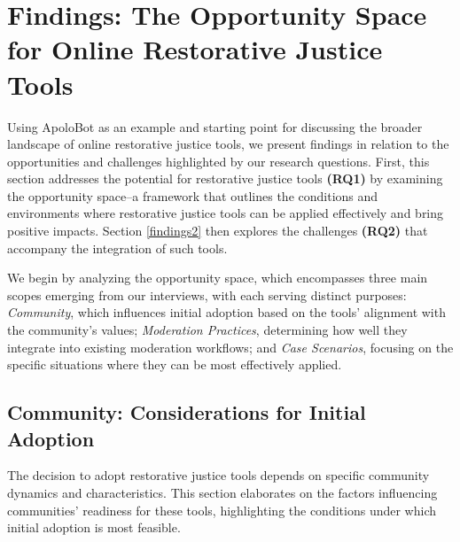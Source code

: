 \section{Findings: The Opportunity Space for Online Restorative Justice Tools} \label{findings1}
Using ApoloBot as an example and starting point for discussing the broader landscape of online restorative justice tools, we present findings in relation to the opportunities and challenges highlighted by our research questions. First, this section addresses the potential for restorative justice tools \textbf{(RQ1)} by examining the opportunity space--a framework that outlines the conditions and environments where restorative justice tools can be applied effectively and bring positive impacts. Section \ref{findings2} then explores the challenges \textbf{(RQ2)} that accompany the integration of such tools.

We begin by analyzing the opportunity space, which encompasses three main scopes emerging from our interviews, with each serving distinct purposes: \textit{Community}, which influences initial adoption based on the tools' alignment with the community’s values; \textit{Moderation Practices}, determining how well they integrate into existing moderation workflows; and \textit{Case Scenarios}, focusing on the specific situations where they can be most effectively applied.

\subsection{Community: Considerations for Initial Adoption}
The decision to adopt restorative justice tools depends on specific community dynamics and characteristics. This section elaborates on the factors influencing communities' readiness for these tools, highlighting the conditions under which initial adoption is most feasible.


